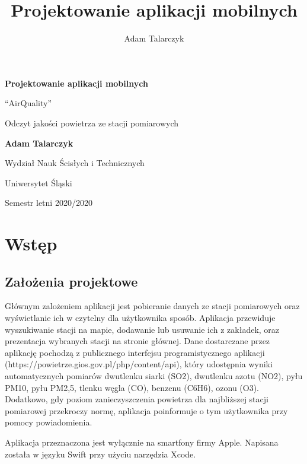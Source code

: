 \documentclass[a4paper,11pt,titlepage]{article}
\author{Adam Talarczyk}
\title{Projektowanie aplikacji mobilnych}
\begin{document}
\begin{titlepage}
    \begin{center}
        \vspace*{1cm}
 
        \Huge
        \textbf{Projektowanie aplikacji mobilnych}
 
        \vspace{0.5cm}
        \LARGE
        ``AirQuality''


 Odczyt jakości powietrza ze stacji pomiarowych
 
        \vspace{1.5cm}
 
        \textbf{Adam Talarczyk}
 
        \vfill
 
        \vspace{0.8cm}
 
        \Large
        Wydział Nauk Ścisłych i Technicznych

        Uniwersytet Śląski

	Semestr letni 2020/2020
 
    \end{center}
\end{titlepage}
\newpage
\tableofcontents
\newpage

\section{Wstęp}
\subsection{Założenia projektowe}
Głównym zalożeniem aplikacji jest pobieranie danych ze stacji pomiarowych oraz wyświetlanie ich w czytelny dla użytkownika sposób. Aplikacja przewiduje wyszukiwanie stacji na mapie, dodawanie lub usuwanie ich z zakładek, oraz prezentacja wybranych stacji na stronie głównej. Dane dostarczane przez aplikację pochodzą z publicznego interfejsu programistycznego aplikacji (https://powietrze.gios.gov.pl/php/content/api), który udostępnia wyniki automatycznych pomiarów dwutlenku siarki (SO2), dwutlenku azotu (NO2), pyłu PM10, pyłu PM2,5, tlenku węgla (CO), benzenu (C6H6), ozonu (O3). Dodatkowo, gdy poziom zanieczyszczenia powietrza dla najbliższej stacji pomiarowej przekroczy normę, aplikacja poinformuje o tym użytkownika przy pomocy powiadomienia.

Aplikacja przeznaczona jest wyłącznie na smartfony firmy Apple. Napisana została w języku Swift przy użyciu narzędzia Xcode.
\end{document}
